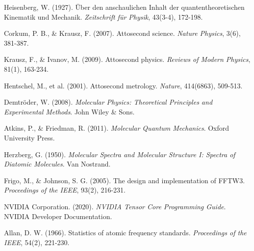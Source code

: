 \documentclass[12pt,a4paper]{article}
\begin{document}

\begin{thebibliography}{99}

Heisenberg, W. (1927). Über den anschaulichen Inhalt der quantentheoretischen Kinematik und Mechanik. \textit{Zeitschrift für Physik}, 43(3-4), 172-198.

Corkum, P. B., \& Krausz, F. (2007). Attosecond science. \textit{Nature Physics}, 3(6), 381-387.

Krausz, F., \& Ivanov, M. (2009). Attosecond physics. \textit{Reviews of Modern Physics}, 81(1), 163-234.

Hentschel, M., et al. (2001). Attosecond metrology. \textit{Nature}, 414(6863), 509-513.

Demtröder, W. (2008). \textit{Molecular Physics: Theoretical Principles and Experimental Methods}. John Wiley \& Sons.

Atkins, P., \& Friedman, R. (2011). \textit{Molecular Quantum Mechanics}. Oxford University Press.

Herzberg, G. (1950). \textit{Molecular Spectra and Molecular Structure I: Spectra of Diatomic Molecules}. Van Nostrand.

Frigo, M., \& Johnson, S. G. (2005). The design and implementation of FFTW3. \textit{Proceedings of the IEEE}, 93(2), 216-231.

NVIDIA Corporation. (2020). \textit{NVIDIA Tensor Core Programming Guide}. NVIDIA Developer Documentation.

Allan, D. W. (1966). Statistics of atomic frequency standards. \textit{Proceedings of the IEEE}, 54(2), 221-230.

\end{thebibliography}
\end{document}
